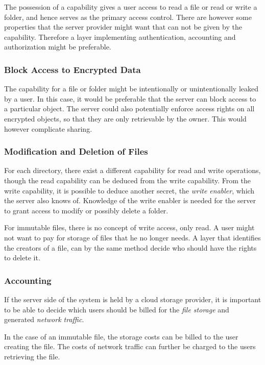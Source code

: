 \documentclass[pdftex,english,10pt,b5paper,twoside]{book}
\begin{document}
The possession of a capability gives a user access to read a file or read or
write a folder, and hence serves as the primary access control. There are
however some properties that the server provider might want that can not be
given by the capability. Therefore a layer implementing authentication,
accounting and authorization might be preferable.

\subsubsection{Block Access to Encrypted Data}

The capability for a file or folder might be intentionally or unintentionally
leaked by a user. In this case, it would be preferable that the server can
block access to a particular object. The server could also potentially enforce
access rights on all encrypted objects, so that they are only retrievable by
the owner. This would however complicate sharing. 

\subsubsection{Modification and Deletion of Files}

For each directory, there exist a different capability for read and write
operations, though the read capability can be deduced from the write
capability. From the write capability, it is possible to deduce another secret,
the \emph{write enabler}, which the server also knows of.  Knowledge of the
write enabler is needed for the server to grant access to modify or possibly
delete a folder.

For immutable files, there is no concept of write access, only read. A user
might not want to pay for storage of files that he no longer needs.  A layer
that identifies the creators of a file, can by the same method decide who
should have the rights to delete it.

\subsubsection{Accounting}

If the server side of the system is held by a cloud storage provider, it is
important to be able to decide which users should be billed for the \emph{file
storage} and generated \emph{network traffic}.

In the case of an immutable file, the storage costs can be billed to the user
creating the file. The costs of network traffic can further be charged to the
users retrieving the file.
\end{document}
